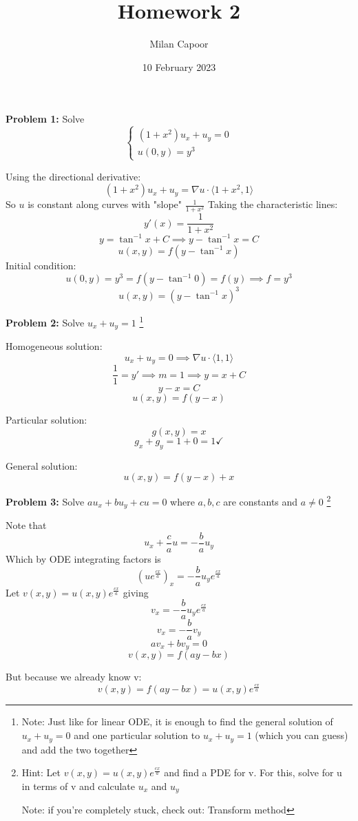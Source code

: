 \documentclass[12pt]{article}
\title{Homework 2}
\author{Milan Capoor}
\date{10 February 2023}
\newcommand{\ans}[1]{\boxed{\text{#1}}}
\newcommand{\brak}[1]{\langle#1\rangle}
\begin{document}
\maketitle
\textbf{Problem 1:} Solve 
\[\begin{cases}
    (1 + x^2)u_x + u_y = 0\\
    u(0, y) = y^3
\end{cases}\]

\color{blue}
Using the directional derivative:
\[(1 + x^2)u_x + u_y = \nabla u \cdot \brak{1 +x^2, 1}\]
So $u$ is constant along curves with "slope" $\frac{1}{1+x^2}$
Taking the characteristic lines:
\[y'(x) = \frac{1}{1+x^2}\]
\[y = \tan^{-1} x + C \implies y - \tan^{-1} x = C\]
\[u(x, y) = f(y - \tan^{-1} x)\]
Initial condition:
\[u(0, y) = y^3 = f(y - \tan^{-1} 0) = f(y) \implies f = y^3\]
\[\ans{$u(x, y) = (y - \tan^{-1}x)^3$}\]
\color{black}

\pagebreak
\textbf{Problem 2:} Solve $u_x + u_y = 1$ \footnote{
    Note: Just like for linear ODE, it is enough to find the general solution of $u_x + u_y = 0$ and one particular solution to $u_x + u_y = 1$ (which you can guess) and add the two together}

\color{blue}
Homogeneous solution:
\[u_x + u_y = 0 \implies \nabla u \cdot \brak{1, 1}\] 
\[\frac{1}{1} = y' \implies m = 1 \implies y = x + C\]
\[y - x = C\]
\[u(x, y) = f(y - x)\]

Particular solution:
\[g(x, y) = x\]
\[g_x + g_y = 1 + 0 = 1 \checkmark\]

General solution:
\[\ans{$u(x, y) = f(y - x) + x$}\]
\color{black}

\pagebreak
\textbf{Problem 3:} Solve $au_x + bu_y + cu =0$ where $a, b, c$ are constants and $a \neq 0$ \footnote{
    Hint: Let $v(x, y) = u(x, y)e^{\frac{cx}{a}}$ and find a PDE for v. For this, solve for u in terms of v and calculate $u_x$ and $u_y$

    Note: if you're completely stuck, check out: Transform method}

\color{blue}
    Note that 
    \[u_x + \frac{c}{a}u = -\frac{b}{a}u_y\]
    Which by ODE integrating factors is
    \[\left(ue^{\frac{cx}{a}}\right)_x = -\frac{b}{a}u_ye^{\frac{cx}{a}}\]
    Let $v(x, y) = u(x, y)e^{\frac{cx}{a}}$ giving 
    \[v_x = -\frac{b}{a}u_ye^{\frac{cx}{a}}\]
    \[v_x = -\frac{b}{a}v_y\]
    \[av_x + bv_y = 0\]
    \[v(x, y) = f(ay - bx)\]

    But because we already know v:
    \[v(x, y) = f(ay - bx) = u(x, y)e^\frac{cx}{a}\]
    
\end{document}
